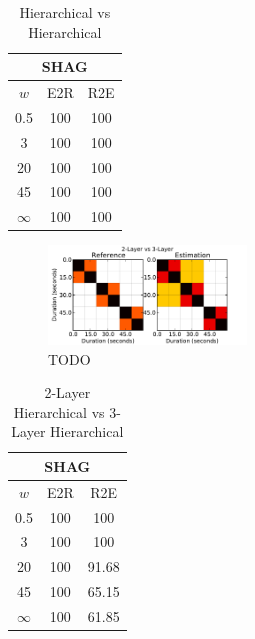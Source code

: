 \documentclass{article}
\begin{document}
\begin{table}
 \begin{center}
   \begin{tabular}{|c|c|c|}
  \hline
  \multicolumn{3}{|c|}{\textbf{SHAG}} \\
  \hline
  $w$       & E2R    & R2E      \\
  \hline
  0.5       & 100       & 100      \\     
  3         & 100       & 100      \\
  20        & 100     & 100    \\
  45        & 100     & 100    \\
  $\infty$  & 100     & 100    \\
  \hline
 \end{tabular}
\end{center}
  \caption{Hierarchical vs Hierarchical}
  \label{tab:hier-hier}
\end{table}

\begin{figure}
  \centering
  \includegraphics[width=0.47\textwidth]{plots/hier-hiercomp.pdf}
  \caption{TODO}
  \label{fig:hier-hiercomp}
\end{figure}%

\begin{table}
 \begin{center}
   \begin{tabular}{|c|c|c|}
  \hline
  \multicolumn{3}{|c|}{\textbf{SHAG}} \\
  \hline
  $w$       & E2R       & R2E      \\
  \hline
  0.5       & 100       & 100      \\     
  3         & 100       & 100      \\
  20        & 100       & 91.68    \\
  45        & 100       & 65.15    \\
  $\infty$  & 100       & 61.85    \\
  \hline
 \end{tabular}
\end{center}
  \caption{2-Layer Hierarchical vs 3-Layer Hierarchical}
  \label{tab:hier-hiercomp}
\end{table}
\end{document}
